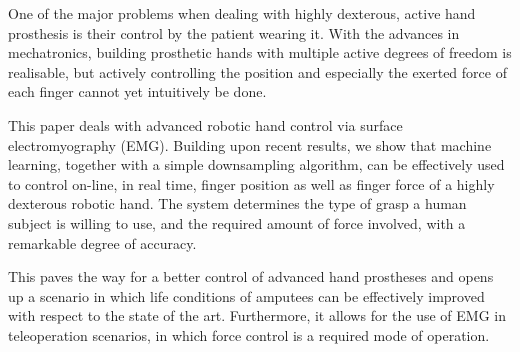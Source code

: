 One of the major problems when dealing with highly dexterous, active hand
prosthesis is their control by the patient wearing it. With the advances
in mechatronics, building prosthetic hands with multiple active degrees of
freedom is realisable, but actively controlling the position and especially
the exerted force of each finger cannot yet intuitively be done.

This paper deals with advanced robotic hand control via surface electromyography (EMG).
Building upon recent results, we show that machine learning,
together with a simple downsampling algorithm, can be effectively used
to control on-line, in real time, finger position as well as finger force
of a highly dexterous robotic hand. The
system determines the type of grasp a human subject is willing to use,
and the required amount of force involved, with a remarkable degree of
accuracy.

This paves the way for a better control of advanced hand prostheses
and opens up a scenario in which life conditions of amputees can be
effectively improved with respect to the state of the art.  Furthermore, it allows for the use of EMG
in teleoperation scenarios, in which force control is a required mode of operation.

